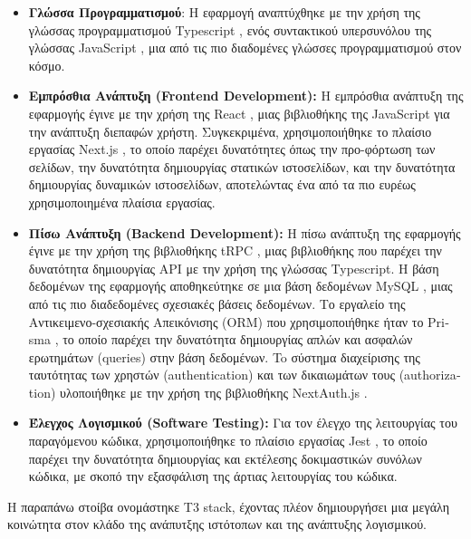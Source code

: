 \begin{itemize}
    \item \textbf{Γλώσσα Προγραμματισμού}: Η εφαρμογή αναπτύχθηκε με την χρήση της γλώσσας προγραμματισμού \textlatin{Typescript} \cite{typescript}, ενός συντακτικού υπερσυνόλου της γλώσσας \textlatin{JavaScript} \cite{javascript}, μια από τις πιο διαδομένες γλώσσες προγραμματισμού στον κόσμο. \cite{tiobe, languagechart}
    \item \textbf{Εμπρόσθια Ανάπτυξη (\textlatin{Frontend Development}):} Η εμπρόσθια ανάπτυξη της εφαρμογής έγινε με την χρήση της \textlatin{React} \cite{react}, μιας βιβλιοθήκης της \textlatin{JavaScript} για την ανάπτυξη διεπαφών χρήστη. Συγκεκριμένα, χρησιμοποιήθηκε το πλαίσιο εργασίας \textlatin{Next.js} \cite{nextjs}, το οποίο παρέχει δυνατότητες όπως την προ-φόρτωση των σελίδων, την δυνατότητα δημιουργίας στατικών ιστοσελίδων, και την δυνατότητα δημιουργίας δυναμικών ιστοσελίδων, αποτελώντας ένα από τα πιο ευρέως χρησιμοποιημένα πλαίσια εργασίας.
    \item \textbf{Πίσω Ανάπτυξη (\textlatin{Backend Development}):} Η πίσω ανάπτυξη της εφαρμογής έγινε με την χρήση της βιβλιοθήκης \textlatin{tRPC} \cite{trpc}, μιας βιβλιοθήκης που παρέχει την δυνατότητα δημιουργίας \textlatin{API} με την χρήση της γλώσσας \textlatin{Typescript}. Η βάση δεδομένων της εφαρμογής αποθηκεύτηκε σε μια βάση δεδομένων \textlatin{MySQL} \cite{mysql}, μιας από τις πιο διαδεδομένες σχεσιακές βάσεις δεδομένων. Tο εργαλείο της Αντικειμενο-σχεσιακής Απεικόνισης \textlatin{(ORM)} που χρησιμοποιήθηκε ήταν το \textlatin{Prisma} \cite{prisma}, το οποίο παρέχει την δυνατότητα δημιουργίας απλών και ασφαλών ερωτημάτων \textlatin{(queries)} στην βάση δεδομένων. To σύστημα διαχείρισης της ταυτότητας των χρηστών \textlatin{(authentication)} και των δικαιωμάτων τους \textlatin{(authorization)} υλοποιήθηκε με την χρήση της βιβλιοθήκης \textlatin{NextAuth.js} \cite{nextauth}.
    \item \textbf{Έλεγχος Λογισμικού (\textlatin{Software Testing}):} Για τον έλεγχο της λειτουργίας του παραγόμενου κώδικα, χρησιμοποιήθηκε το πλαίσιο εργασίας \textlatin{Jest} \cite{jest}, το οποίο παρέχει την δυνατότητα δημιουργίας και εκτέλεσης δοκιμαστικών συνόλων κώδικα, με σκοπό την εξασφάλιση της άρτιας λειτουργίας του κώδικα. \cite{Jacobson1999,irena2008,swebok2004,miller1981,shaw1990}
\end{itemize}

Η παραπάνω στοίβα ονομάστηκε \textlatin{T3 stack}, έχοντας πλέον δημιουργήσει μια μεγάλη κοινώτητα στον κλάδο της ανάπυτξης ιστότοπων και της ανάπτυξης λογισμικού. \cite{t3repo}

